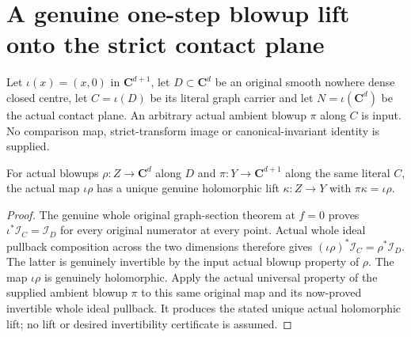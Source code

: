 \section{A genuine one-step blowup lift onto the strict contact plane}

Let $\iota(x)=(x,0)$ in $\mathbf C^{d+1}$, let $D\subset\mathbf C^d$
be an original smooth nowhere dense closed centre, let $C=\iota(D)$ be
its literal graph carrier and let $N=\iota(\mathbf C^d)$ be the actual
contact plane. An arbitrary actual ambient blowup $\pi$ along $C$ is
input. No comparison map, strict-transform image or canonical-invariant
identity is supplied.

\begin{theorem}
\label{hir:actual-plane-contact-blowup-universal-lift}
\leanok
For actual blowups $\rho:Z\to\mathbf C^d$ along $D$ and
$\pi:Y\to\mathbf C^{d+1}$ along the same literal $C$, the actual map
$\iota\rho$ has a unique genuine holomorphic lift $\kappa:Z\to Y$
with $\pi\kappa=\iota\rho$.
\end{theorem}
\begin{proof}
The genuine whole original graph-section theorem at $f=0$ proves
$\iota^*\mathcal I_C=\mathcal I_D$ for every original numerator at every
point. Actual whole ideal pullback composition across the two dimensions
therefore gives $(\iota\rho)^*\mathcal I_C=\rho^*\mathcal I_D$.
The latter is genuinely invertible by the input actual blowup property
of $\rho$. The map $\iota\rho$ is genuinely holomorphic. Apply the
actual universal property of the supplied ambient blowup $\pi$ to this
same original map and its now-proved invertible whole ideal pullback.
It produces the stated unique actual holomorphic lift; no lift or desired
invertibility certificate is assumed.
\end{proof}

